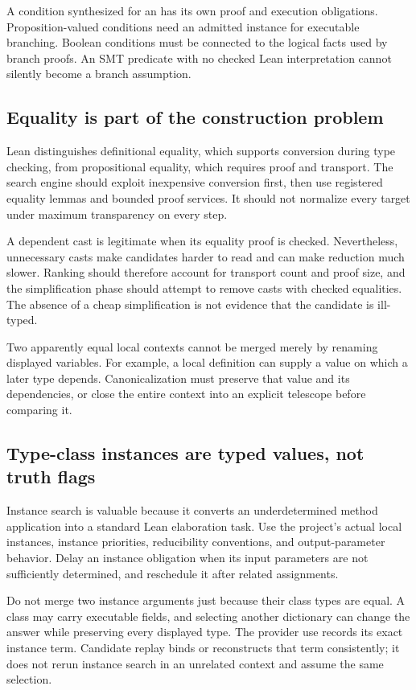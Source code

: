 \documentclass[11pt,letterpaper]{article}
\newcommand{\id}[1]{\texttt{\detokenize{#1}}}
\theoremstyle{definition}
\theoremstyle{remark}
\begin{document}
A condition synthesized for an \id{if} has its own proof and execution obligations. Proposition-valued conditions need an admitted \id{Decidable} instance for executable branching. Boolean conditions must be connected to the logical facts used by branch proofs. An SMT predicate with no checked Lean interpretation cannot silently become a branch assumption.

\subsection{Equality is part of the construction problem}

Lean distinguishes definitional equality, which supports conversion during type checking, from propositional equality, which requires proof and transport. The search engine should exploit inexpensive conversion first, then use registered equality lemmas and bounded proof services. It should not normalize every target under maximum transparency on every step.

A dependent cast is legitimate when its equality proof is checked. Nevertheless, unnecessary casts make candidates harder to read and can make reduction much slower. Ranking should therefore account for transport count and proof size, and the simplification phase should attempt to remove casts with checked equalities. The absence of a cheap simplification is not evidence that the candidate is ill-typed.

Two apparently equal local contexts cannot be merged merely by renaming displayed variables. For example, a local \id{let} definition can supply a value on which a later type depends. Canonicalization must preserve that value and its dependencies, or close the entire context into an explicit telescope before comparing it.

\subsection{Type-class instances are typed values, not truth flags}

Instance search is valuable because it converts an underdetermined method application into a standard Lean elaboration task. Use the project's actual local instances, instance priorities, reducibility conventions, and output-parameter behavior. Delay an instance obligation when its input parameters are not sufficiently determined, and reschedule it after related assignments.

Do not merge two instance arguments just because their class types are equal. A class may carry executable fields, and selecting another dictionary can change the answer while preserving every displayed type. The provider use records its exact instance term. Candidate replay binds or reconstructs that term consistently; it does not rerun instance search in an unrelated context and assume the same selection.
\end{document}
